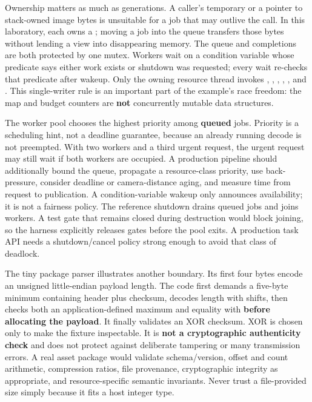 Ownership matters as much as generations. A caller's temporary  or a pointer to stack-owned image bytes is unsuitable for a job that may outlive the call. In this laboratory, each  owns a ; moving a job into the queue transfers those bytes without lending a view into disappearing memory. The queue and completions are both protected by one mutex. Workers wait on a condition variable whose predicate says either work exists or shutdown was requested; every wait re-checks that predicate after wakeup. Only the owning resource thread invokes , , , , ,  and . This single-writer rule is an important part of the example's race freedom: the map and budget counters are \textbf{not} concurrently mutable data structures.

The worker pool chooses the highest priority among \textbf{queued} jobs. Priority is a scheduling hint, not a deadline guarantee, because an already running decode is not preempted. With two workers and a third urgent request, the urgent request may still wait if both workers are occupied. A production pipeline should additionally bound the queue, propagate a resource-class priority, use back-pressure, consider deadline or camera-distance aging, and measure time from request to publication. A condition-variable wakeup only announces availability; it is not a fairness policy. The reference shutdown drains queued jobs and joins workers. A test gate that remains closed during destruction would block joining, so the harness explicitly releases gates before the pool exits. A production task API needs a shutdown/cancel policy strong enough to avoid that class of deadlock.

The tiny package parser illustrates another boundary. Its first four bytes encode an unsigned little-endian payload length. The code first demands a five-byte minimum containing header plus checksum, decodes length with shifts, then checks both an application-defined maximum and equality with  \textbf{before allocating the payload}. It finally validates an XOR checksum. XOR is chosen only to make the fixture inspectable. It is \textbf{not a cryptographic authenticity check} and does not protect against deliberate tampering or many transmission errors. A real asset package would validate schema/version, offset and count arithmetic, compression ratios, file provenance, cryptographic integrity as appropriate, and resource-specific semantic invariants. Never trust a file-provided size simply because it fits a host integer type.

